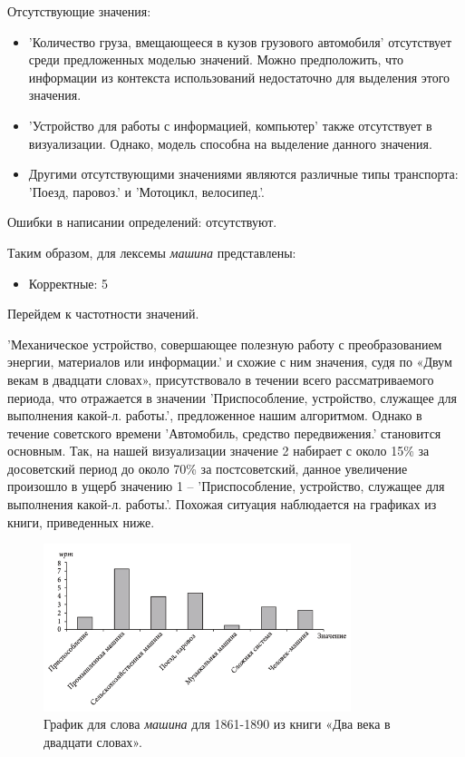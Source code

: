 Отсутствующие значения:
\begin{itemize}
    \item ’Количество груза, вмещающееся в кузов грузового автомобиля’ отсутствует среди предложенных моделью значений.
Можно предположить, что информации из контекста использований недостаточно для выделения этого значения.

    \item ’Устройство для работы с информацией, компьютер’ также отсутствует в визуализации.
Однако, модель способна на выделение данного значения.  %

    \item Другими отсутствующими значениями являются различные типы транспорта:
’Поезд, паровоз.’ и ’Мотоцикл, велосипед.’.   %
\end{itemize}

Ошибки в написании определений: отсутствуют.

Таким образом, для лексемы \textit{машина} представлены:

\begin{itemize}
    \item Корректные: 5
\end{itemize}

Перейдем к частотности значений.

’Механическое устройство, совершающее полезную работу с преобразованием энергии,
материалов или информации.’ и схожие с ним значения, судя по «Двум векам в двадцати словах»,
присутствовало в течении всего рассматриваемого периода, что отражается в значении
’Приспособление, устройство, служащее для выполнения какой-л. работы.’, предложенное
нашим алгоритмом.
Однако в течение советского времени ’Автомобиль, средство передвижения.’ становится основным.
Так, на нашей визуализации значение 2 набирает с около 15\% за досоветский период
до около 70\% за постсоветский, данное увеличение произошло в ущерб значению 1 –
’Приспособление, устройство, служащее для выполнения какой-л. работы.’.
Похожая ситуация наблюдается на графиках из книги, приведенных ниже.

\noindent %
\begin{figure}[H]
    \centering %
    \includegraphics[width=0.8\textwidth]{img/book/mashina/1861-1890}
    \caption{График для слова \textit{машина} для 1861-1890 из книги «Два века в двадцати словах».}
\end{figure}

